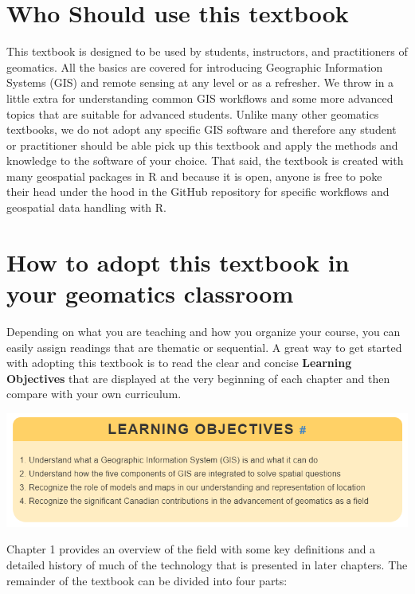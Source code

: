 \documentclass[
]{book}
\begin{document}
\hypertarget{who-should-use-this-textbook}{%
\section*{Who Should use this textbook}\label{who-should-use-this-textbook}}

This textbook is designed to be used by students, instructors, and practitioners of geomatics. All the basics are covered for introducing Geographic Information Systems (GIS) and remote sensing at any level or as a refresher. We throw in a little extra for understanding common GIS workflows and some more advanced topics that are suitable for advanced students. Unlike many other geomatics textbooks, we do not adopt any specific GIS software and therefore any student or practitioner should be able pick up this textbook and apply the methods and knowledge to the software of your choice. That said, the textbook is created with many geospatial packages in R and because it is open, anyone is free to poke their head under the hood in the GitHub repository for specific workflows and geospatial data handling with R.

\hypertarget{how-to-adopt-this-textbook-in-your-geomatics-classroom}{%
\section*{How to adopt this textbook in your geomatics classroom}\label{how-to-adopt-this-textbook-in-your-geomatics-classroom}}

Depending on what you are teaching and how you organize your course, you can easily assign readings that are thematic or sequential. A great way to get started with adopting this textbook is to read the clear and concise \textbf{Learning Objectives} that are displayed at the very beginning of each chapter and then compare with your own curriculum.

\includegraphics[width=0.75\linewidth]{images/00-learning-objectives}

Chapter 1 provides an overview of the field with some key definitions and a detailed history of much of the technology that is presented in later chapters. The remainder of the textbook can be divided into four parts:
\end{document}
